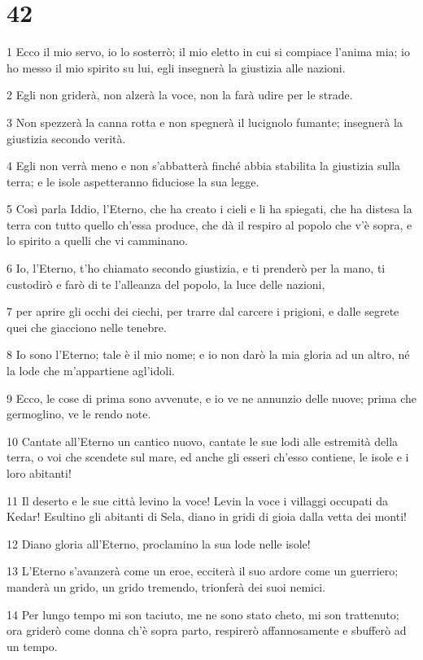 \chapter{42}

\par 1 Ecco il mio servo, io lo sosterrò; il mio eletto in cui si compiace l'anima mia; io ho messo il mio spirito su lui, egli insegnerà la giustizia alle nazioni.
\par 2 Egli non griderà, non alzerà la voce, non la farà udire per le strade.
\par 3 Non spezzerà la canna rotta e non spegnerà il lucignolo fumante; insegnerà la giustizia secondo verità.
\par 4 Egli non verrà meno e non s'abbatterà finché abbia stabilita la giustizia sulla terra; e le isole aspetteranno fiduciose la sua legge.
\par 5 Così parla Iddio, l'Eterno, che ha creato i cieli e li ha spiegati, che ha distesa la terra con tutto quello ch'essa produce, che dà il respiro al popolo che v'è sopra, e lo spirito a quelli che vi camminano.
\par 6 Io, l'Eterno, t'ho chiamato secondo giustizia, e ti prenderò per la mano, ti custodirò e farò di te l'alleanza del popolo, la luce delle nazioni,
\par 7 per aprire gli occhi dei ciechi, per trarre dal carcere i prigioni, e dalle segrete quei che giacciono nelle tenebre.
\par 8 Io sono l'Eterno; tale è il mio nome; e io non darò la mia gloria ad un altro, né la lode che m'appartiene agl'idoli.
\par 9 Ecco, le cose di prima sono avvenute, e io ve ne annunzio delle nuove; prima che germoglino, ve le rendo note.
\par 10 Cantate all'Eterno un cantico nuovo, cantate le sue lodi alle estremità della terra, o voi che scendete sul mare, ed anche gli esseri ch'esso contiene, le isole e i loro abitanti!
\par 11 Il deserto e le sue città levino la voce! Levin la voce i villaggi occupati da Kedar! Esultino gli abitanti di Sela, diano in gridi di gioia dalla vetta dei monti!
\par 12 Diano gloria all'Eterno, proclamino la sua lode nelle isole!
\par 13 L'Eterno s'avanzerà come un eroe, ecciterà il suo ardore come un guerriero; manderà un grido, un grido tremendo, trionferà dei suoi nemici.
\par 14 Per lungo tempo mi son taciuto, me ne sono stato cheto, mi son trattenuto; ora griderò come donna ch'è sopra parto, respirerò affannosamente e sbufferò ad un tempo.
